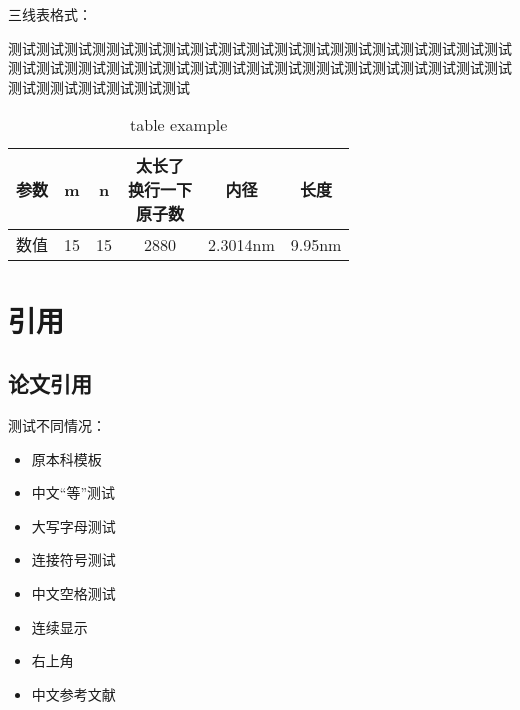 \documentclass[AutoFakeBold]{LZUThesis-PgD&PhD}
\begin{document}
三线表格式：

测试测试测试测测试测试测试测试测试测试测试测试测测试测试测试测试测试测试测试测试测测试测试测试测试测试测试测试测试测测试测试测试测试测试测试测试测试测测试测试测试测试测试


\begin{table}[hbt!]\label{tbl:mole}
  \centering
  \begin{tabular*}{0.9\textwidth}{@{\extracolsep{\fill}}cccccc}
    \toprule
    参数& m & n & \tabincell{c}{太长了\\换行一下\\原子数}  & 内径 & 长度\\
    \midrule
    数值 & 15 & 15  & 2880 & 2.3014nm & 9.95nm \\
    \bottomrule
  \end{tabular*}
  \caption{table example}
\end{table}


\section{引用}

\subsection{论文引用}

测试不同情况：

\begin{itemize}
  \item 原本科模板\cite{partl2016}
  \item 中文“等”测试\cite{partl2021}
  \item 大写字母测试\cite{partl2022-2}
  \item 连接符号测试\cite{partl2022-3}
  \item 中文空格测试\cite{partl2022}
  \item 连续显示\cite{partl2021,partl2022-2,partl2022-3}
  \item 右上角 
  \item 中文参考文献 \cite{李刚2006基于动态光谱的脉搏血氧测量精度分析}
\end{itemize}
\end{document}

